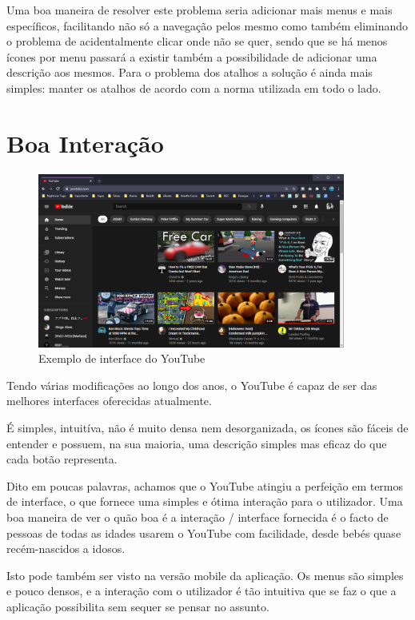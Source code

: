 \documentclass[11pt]{article}
\begin{document}
	Uma boa maneira de resolver este problema seria adicionar mais menus e mais específicos, facilitando não só a navegação pelos mesmo como também eliminando o problema de acidentalmente clicar onde não se quer, sendo que se há menos ícones por menu passará a existir também a possibilidade de adicionar uma descrição aos mesmos. Para o problema dos atalhos a solução é ainda mais simples: manter os atalhos de acordo com a norma utilizada em todo o lado.
	
	\large
	\section{Boa Interação}
	
	\normalsize
	\begin{figure}[h]
		\includegraphics[width=0.9\textwidth]{youtube}
		\centering
		\caption{Exemplo de interface do YouTube}
		\label{fig:youtube}
	\end{figure}

	Tendo várias modificações ao longo dos anos, o YouTube é capaz de ser das melhores interfaces oferecidas atualmente.
	
	É simples, intuitíva, não é muito densa nem desorganizada, os ícones são fáceis de entender e possuem, na sua maioria, uma descrição simples mas eficaz do que cada botão representa.
	
	Dito em poucas palavras, achamos que o YouTube atingiu a perfeição em termos de interface, o que fornece uma simples e ótima interação para o utilizador. Uma boa maneira de ver o quão boa é a interação / interface fornecida é o facto de pessoas de todas as idades usarem o YouTube com facilidade, desde bebés quase recém-nascidos a idosos.
	
	Isto pode também ser visto na versão mobile da aplicação. Os menus são simples e pouco densos, e a interação com o utilizador é tão intuitiva que se faz o que a aplicação possibilita sem sequer se pensar no assunto.
	
\end{document}
